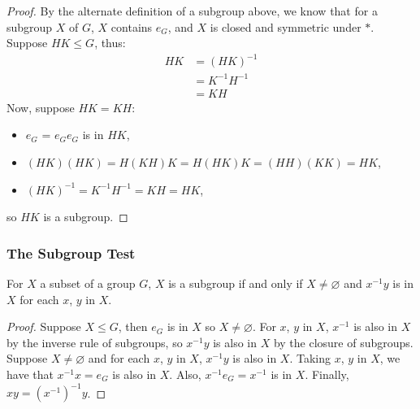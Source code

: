 \begin{proof}
    By the alternate definition of a subgroup above, we know that for a subgroup
    $X$ of $G$, $X$ contains $e_G$, and $X$ is closed and symmetric under $\ast$.
    \\[\baselineskip]
    Suppose $HK \leq G$, thus: \begin{align*}
        HK &= (HK)^{-1} \\
        &= K^{-1}H^{-1} \\
        &= KH
    \end{align*} Now, suppose $HK = KH$: \begin{itemize}
        \item $e_G$ = $e_Ge_G$ is in $HK$,
        \item $(HK)(HK) = H(KH)K = H(HK)K = (HH)(KK) = HK$,
        \item $(HK)^{-1} = K^{-1}H^{-1} = KH = HK$,
    \end{itemize} so $HK$ is a subgroup.
\end{proof}

\subsubsection{The Subgroup Test}

For $X$ a subset of a group $G$, $X$ is a subgroup if and only if $X \neq \varnothing$
and $x^{-1}y$ is in $X$ for each $x$, $y$ in $X$.

\begin{proof}
    Suppose $X \leq G$, then $e_G$ is in $X$ so $X \neq \varnothing$. For $x$, $y$ in $X$,
    $x^{-1}$ is also in $X$ by the inverse rule of subgroups, so $x^{-1}y$ is also
    in $X$ by the closure of subgroups.
    \\[\baselineskip]
    Suppose $X \neq \varnothing$ and for each $x$, $y$ in $X$, $x^{-1}y$ is also in $X$.
    Taking $x$, $y$ in $X$, we have that $x^{-1}x = e_G$ is also in $X$. 
    Also, $x^{-1}e_G = x^{-1}$ is in $X$. Finally, $xy = (x^{-1})^{-1}y$.
\end{proof}

